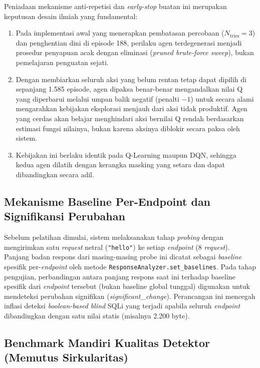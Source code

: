 Peniadaan mekanisme anti-repetisi dan \textit{early-stop} buatan ini merupakan keputusan desain ilmiah yang fundamental:
\begin{enumerate}
    \item Pada implementasi awal yang menerapkan pembatasan percobaan ($N_{\text{tries}} = 3$) dan penghentian dini di episode 188, perilaku agen terdegenerasi menjadi prosedur penyapuan acak dengan eliminasi (\textit{pruned brute-force sweep}), bukan pemelajaran penguatan sejati.
    \item Dengan membiarkan seluruh aksi yang belum rentan tetap dapat dipilih di sepanjang 1.585 episode, agen dipaksa benar-benar mengandalkan nilai Q yang diperbarui melalui umpan balik negatif (penalti $-1$) untuk secara alami mengarahkan kebijakan eksplorasi menjauh dari aksi tidak produktif. Agen yang cerdas akan belajar menghindari aksi bernilai Q rendah berdasarkan estimasi fungsi nilainya, bukan karena aksinya diblokir secara paksa oleh sistem.
    \item Kebijakan ini berlaku identik pada Q-Learning maupun DQN, sehingga kedua agen dilatih dengan kerangka masking yang setara dan dapat dibandingkan secara adil.
\end{enumerate}

\subsection{Mekanisme Baseline Per-Endpoint dan Signifikansi Perubahan}

Sebelum pelatihan dimulai, sistem melaksanakan tahap \textit{probing} dengan mengirimkan satu \textit{request} netral (\texttt{"hello"}) ke setiap \textit{endpoint} (8 \textit{request}). Panjang badan respons dari masing-masing probe ini dicatat sebagai \textit{baseline} spesifik per-\textit{endpoint} oleh metode \texttt{ResponseAnalyzer.set\_baselines}. Pada tahap pengujian, perbandingan antara panjang respons saat ini terhadap baseline spesifik dari \textit{endpoint} tersebut (bukan baseline global tunggal) digunakan untuk mendeteksi perubahan signifikan (\textit{significant\_change}). Perancangan ini mencegah inflasi deteksi \textit{boolean-based blind} SQLi yang terjadi apabila seluruh \textit{endpoint} dibandingkan dengan satu nilai statis (misalnya 2.200 byte).

\subsection{Benchmark Mandiri Kualitas Detektor (Memutus Sirkularitas)}


